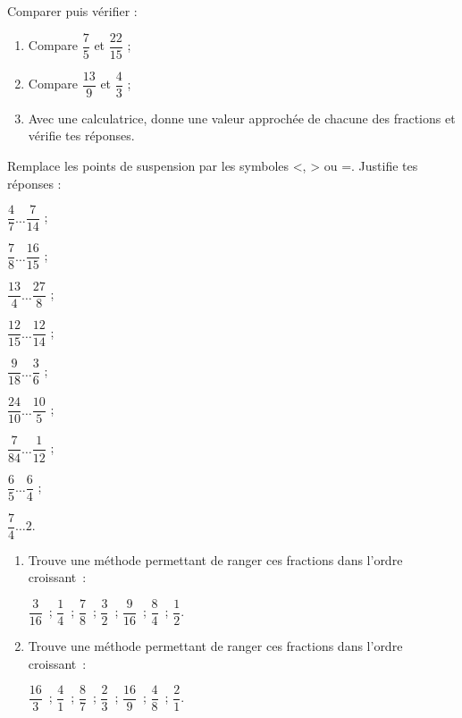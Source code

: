 \begin{exercice}
Comparer puis vérifier :\vspace{0.3em}
\begin{enumerate}
  \item Compare $\dfrac{7}{5}$ et $\dfrac{22}{15}$ ;
  \vspace{0.3em}
  \item Compare $\dfrac{13}{9}$ et $\dfrac{4}{3}$ ;
  \item Avec une calculatrice, donne une valeur approchée de chacune des fractions et vérifie tes réponses.
 \end{enumerate}
\end{exercice}


\begin{exercice}
Remplace les points de suspension par les symboles <, > ou =. Justifie tes réponses :
\vspace{0.3em}
\begin{colenumerate}{3}
 \item $\dfrac{4}{7} \ldots \dfrac{7}{14}$ ; 
 \vspace{0.2cm}
 \item $\dfrac{7}{8} \ldots \dfrac{16}{15}$ ;
 \vspace{0.2cm}
 \item $\dfrac{13}{4} \ldots \dfrac{27}{8}$ ; 
 \item $\dfrac{12}{15} \ldots \dfrac{12}{14}$ ; 
 \item $\dfrac{9}{18} \ldots \dfrac{3}{6}$ ; 
 \item $\dfrac{24}{10} \ldots \dfrac{10}{5}$ ; 
 \item $\dfrac{7}{84} \ldots \dfrac{1}{12}$ ; 
 \item $\dfrac{6}{5} \ldots \dfrac{6}{4}$ ; 
 \item $\dfrac{7}{4} \ldots 2$.
 \end{colenumerate}
\end{exercice}


\begin{exercice}[De l'ordre !]
\begin{enumerate}
 \item Trouve une méthode permettant de ranger ces fractions dans l'ordre croissant : 
 \vspace{.5cm}
 \begin{center} $\dfrac{3}{16}$ ; $\dfrac{1}{4}$ ; $\dfrac{7}{8}$ ; $\dfrac{3}{2}$ ; $\dfrac{9}{16}$ ; $\dfrac{8}{4}$ ; $\dfrac{1}{2}$. \end{center}
 \vspace{0.5cm}
 \item Trouve une méthode permettant de ranger ces fractions dans l'ordre croissant : 
 \vspace{.5cm}
 \begin{center} $\dfrac{16}{3}$ ; $\dfrac{4}{1}$ ; $\dfrac{8}{7}$ ; $\dfrac{2}{3}$ ; $\dfrac{16}{9}$ ; $\dfrac{4}{8}$ ; $\dfrac{2}{1}$. \end{center}
 \end{enumerate}
\end{exercice}



